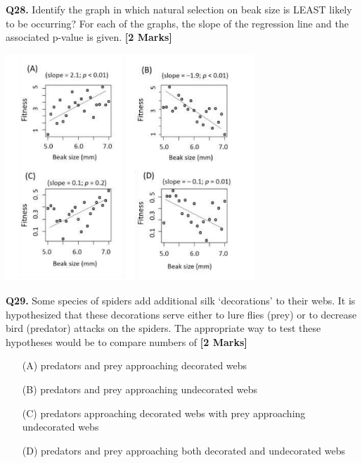 \documentclass[11pt]{article}
\newcommand{\questionb}[2]{
    \noindent\textbf{Q#2.} #1 \hfill \textbf{[2 Marks]}
}
\begin{document}
\questionb{Identify the graph in which natural selection on beak size is LEAST likely to be occurring? For each of the graphs, the slope of the regression line and the associated p-value is given.}{28}
\begin{center}
\includegraphics[width=0.7\textwidth]{figures/28}
\end{center}
\vspace{0.5cm}

\questionb{Some species of spiders add additional silk ‘decorations’ to their webs. It is hypothesized that these decorations serve either to lure flies (prey) or to decrease bird (predator) attacks on the spiders. The appropriate way to test these hypotheses would be to compare numbers of}{29}
\begin{enumerate}
    \item[(A)] predators and prey approaching decorated webs
    \item[(B)] predators and prey approaching undecorated webs
    \item[(C)] predators approaching decorated webs with prey approaching undecorated webs
    \item[(D)] predators and prey approaching both decorated and undecorated webs
\end{enumerate}
\vspace{0.5cm}
\end{document}
